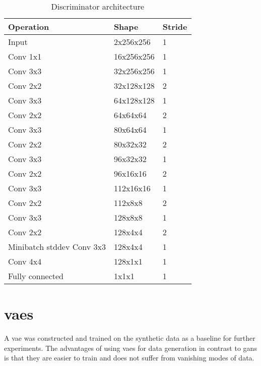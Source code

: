 \begin{table}[t]
    \centering
    \caption{Discriminator architecture}
    \label{tab:generator}
    \begin{tabular}{lll}
        \hline
        Operation          & Shape     & Stride \\ \hline
        Input              & 2x256x256   & 1   \\
        Conv 1x1           & 16x256x256 & 1    \\ 
        Conv 3x3           & 32x256x256 & 1    \\ 
        Conv 2x2           & 32x128x128 & 2    \\ \hline
        Conv 3x3           & 64x128x128 & 1    \\ 
        Conv 2x2           & 64x64x64 & 2      \\ \hline
        Conv 3x3           & 80x64x64 & 1      \\ 
        Conv 2x2           & 80x32x32 & 2      \\ \hline
        Conv 3x3           & 96x32x32 & 1      \\ 
        Conv 2x2           & 96x16x16 & 2      \\ \hline
        Conv 3x3           & 112x16x16 & 1     \\ 
        Conv 2x2           & 112x8x8 & 2       \\ \hline
        Conv 3x3           & 128x8x8 & 1       \\ 
        Conv 2x2           & 128x4x4 & 2       \\ \hline
        Minibatch stddev
        Conv 3x3           & 128x4x4   & 1     \\
        Conv 4x4           & 128x1x1   & 1     \\ 
        Fully connected    & 1x1x1 & 1         \\
    \end{tabular}
\end{table}

\section{\acrlong{vaes}}
A \acrlong{vae} was constructed and trained on the synthetic data as a baseline for further experiments. The advantages of using \acrshort{vaes} for data generation in contrast to \acrshort{gans} is that they are easier to train and does not suffer from vanishing modes of data.


